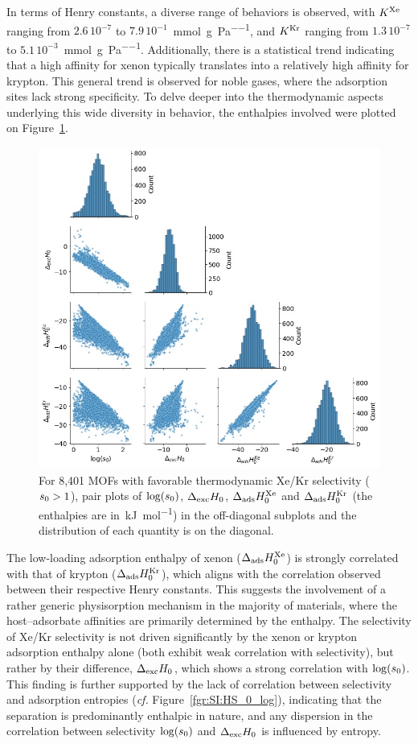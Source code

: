 \documentclass[main.tex]{subfiles}
\begin{document}
In terms of Henry constants, a diverse range of behaviors is observed, with $K^{\text{Xe}}$ ranging from $2.6\,10^{-7}$ to $7.9\,10^{-1}$~\si{\milli\mole\per\gram\per\pascal}, and $K^{\text{Kr}}$ ranging from $1.3\,10^{-7}$ to $5.1\,10^{-3}$~\si{\milli\mole\per\gram\per\pascal}.  Additionally, there is a statistical trend indicating that a high affinity for xenon typically translates into a relatively high affinity for krypton. This general trend is observed for noble gases, where the adsorption sites lack strong specificity. To delve deeper into the thermodynamic aspects underlying this wide diversity in behavior, the enthalpies involved were plotted on Figure~\ref{fgr:histo_H}.

\begin{figure}[t]
\centering
  \includegraphics[width=0.7\linewidth]{figures/2-thermo/Enthalpy_0_log.jpg}
  \caption{For 8,401 MOFs with favorable thermodynamic Xe/Kr selectivity ($s_{\text{0}} > 1$), pair plots of $\log(s_{\text{0}})$, $\Delta_{\text{exc}}H_{\text{0}}$, $\Delta_{\text{ads}}H^{\text{Xe}}_{\text{0}}$ and $\Delta_{\text{ads}}H^{\text{Kr}}_{\text{0}}$ (the enthalpies are in~\si{\kilo\joule\per\mol}) in the off-diagonal subplots and the distribution of each quantity is on the diagonal.}\label{fgr:histo_H}
\end{figure}

The low-loading adsorption enthalpy of xenon ($\Delta_{\text{ads}}H^{\text{Xe}}_{\text{0}}$) is strongly correlated with that of krypton ($\Delta_{\text{ads}}H^{\text{Kr}}_{\text{0}}$), which aligns with the correlation observed between their respective Henry constants. This suggests the involvement of a rather generic physisorption mechanism in the majority of materials, where the host--adsorbate affinities are primarily determined by the enthalpy. The selectivity of Xe/Kr selectivity is not driven significantly by the xenon or krypton adsorption enthalpy alone (both exhibit weak correlation with selectivity), but rather by their difference, $\Delta_{\text{exc}}H_{\text{0}}$, which shows a strong correlation with $\log(s_{\text{0}})$. This finding is further supported by the lack of correlation between selectivity and adsorption entropies (\emph{cf.} Figure~\ref{fgr:SI:HS_0_log}), indicating that the separation is predominantly enthalpic in nature, and any dispersion in the correlation between selectivity $\log(s_{\text{0}})$ and $\Delta_{\text{exc}}H_{\text{0}}$ is influenced by entropy.
\end{document}

